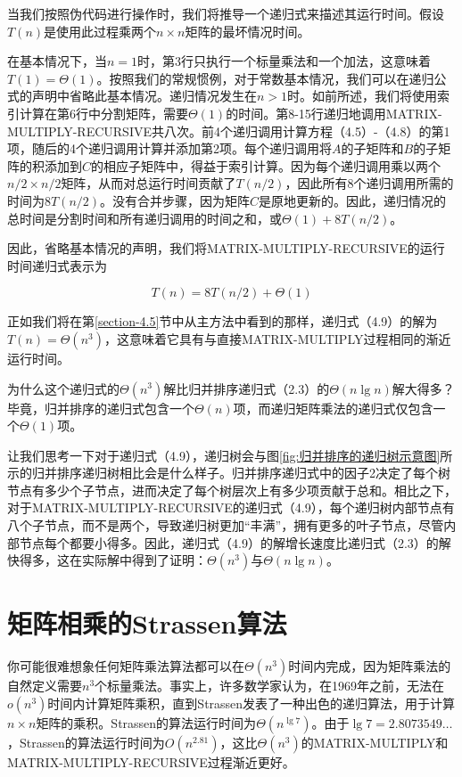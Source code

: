 \documentclass[lang=cn,newtx,10pt,scheme=chinese]{elegantbook}
\begin{document}
当我们按照伪代码进行操作时，我们将推导一个递归式来描述其运行时间。假设$T(n)$是使用此过程乘两个$n \times n$矩阵的最坏情况时间。

在基本情况下，当$n=1$时，第3行只执行一个标量乘法和一个加法，这意味着$T(1)=\Theta(1)$。按照我们的常规惯例，对于常数基本情况，我们可以在递归公式的声明中省略此基本情况。递归情况发生在$n>1$时。如前所述，我们将使用索引计算在第6行中分割矩阵，需要$\Theta(1)$的时间。第8-15行递归地调用MATRIX-MULTIPLY-RECURSIVE共八次。前4个递归调用计算方程（4.5）-（4.8）的第1项，随后的4个递归调用计算并添加第2项。每个递归调用将$A$的子矩阵和$B$的子矩阵的积添加到$C$的相应子矩阵中，得益于索引计算。因为每个递归调用乘以两个$n/2 \times n/2$矩阵，从而对总运行时间贡献了$T(n/2)$，因此所有8个递归调用所需的时间为$8 T(n/2)$。没有合并步骤，因为矩阵$C$是原地更新的。因此，递归情况的总时间是分割时间和所有递归调用的时间之和，或$\Theta(1)+8T(n/2)$。

因此，省略基本情况的声明，我们将MATRIX-MULTIPLY-RECURSIVE的运行时间递归式表示为

\begin{equation}
T(n)=8 T(n / 2)+\Theta(1)
\end{equation}

正如我们将在第\ref{section-4.5}节中从主方法中看到的那样，递归式（4.9）的解为$T(n)=\Theta\left(n^3\right)$，这意味着它具有与直接MATRIX-MULTIPLY过程相同的渐近运行时间。

为什么这个递归式的$\Theta\left(n^3\right)$解比归并排序递归式（2.3）的$\Theta(n \lg n)$解大得多？毕竟，归并排序的递归式包含一个$\Theta(n)$项，而递归矩阵乘法的递归式仅包含一个$\Theta(1)$项。

让我们思考一下对于递归式（4.9），递归树会与图\ref{fig:归并排序的递归树示意图}所示的归并排序递归树相比会是什么样子。归并排序递归式中的因子2决定了每个树节点有多少个子节点，进而决定了每个树层次上有多少项贡献于总和。相比之下，对于MATRIX-MULTIPLY-RECURSIVE的递归式（4.9），每个递归树内部节点有八个子节点，而不是两个，导致递归树更加``丰满''，拥有更多的叶子节点，尽管内部节点每个都要小得多。因此，递归式（4.9）的解增长速度比递归式（2.3）的解快得多，这在实际解中得到了证明：$\Theta\left(n^3\right)$与$\Theta(n \lg n)$。

\section{矩阵相乘的Strassen算法}\label{section-4.2}

你可能很难想象任何矩阵乘法算法都可以在$\Theta\left(n^3\right)$时间内完成，因为矩阵乘法的自然定义需要$n^3$个标量乘法。事实上，许多数学家认为，在1969年之前，无法在$o\left(n^3\right)$时间内计算矩阵乘积，直到Strassen发表了一种出色的递归算法，用于计算$n \times n$矩阵的乘积。Strassen的算法运行时间为$\Theta\left(n^{\lg 7}\right)$。由于$\lg 7=2.8073549 \ldots$，Strassen的算法运行时间为$O\left(n^{2.81}\right)$，这比$\Theta\left(n^3\right)$的MATRIX-MULTIPLY和MATRIX-MULTIPLY-RECURSIVE过程渐近更好。
\end{document}
